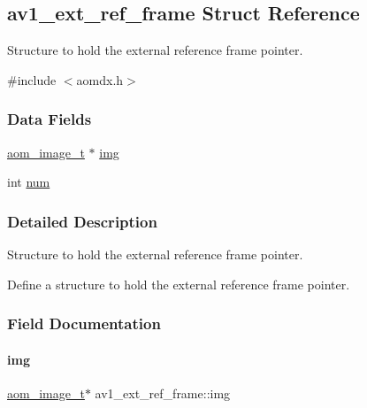 \hypertarget{structav1__ext__ref__frame}{}\subsection{av1\+\_\+ext\+\_\+ref\+\_\+frame Struct Reference}
\label{structav1__ext__ref__frame}


Structure to hold the external reference frame pointer.  




{\ttfamily \#include $<$aomdx.\+h$>$}

\subsubsection*{Data Fields}
\begin{DoxyCompactItemize}
\item 
\hyperlink{aom__image_8h_a5409ae8fdb326fe1cc32622ef4e23748}{aom\+\_\+image\+\_\+t} $\ast$ \hyperlink{structav1__ext__ref__frame_af511f04e9cb8a571b3516eee61414f85}{img}
\item 
int \hyperlink{structav1__ext__ref__frame_a2d249bb9aee60c4b6c67e64b1694bc2f}{num}
\end{DoxyCompactItemize}


\subsubsection{Detailed Description}
Structure to hold the external reference frame pointer. 

Define a structure to hold the external reference frame pointer. 

\subsubsection{Field Documentation}
\mbox{\label{structav1__ext__ref__frame_af511f04e9cb8a571b3516eee61414f85}} 
\paragraph{\texorpdfstring{img}{img}}
{\footnotesize\ttfamily \hyperlink{aom__image_8h_a5409ae8fdb326fe1cc32622ef4e23748}{aom\+\_\+image\+\_\+t}$\ast$ av1\+\_\+ext\+\_\+ref\+\_\+frame\+::img}

